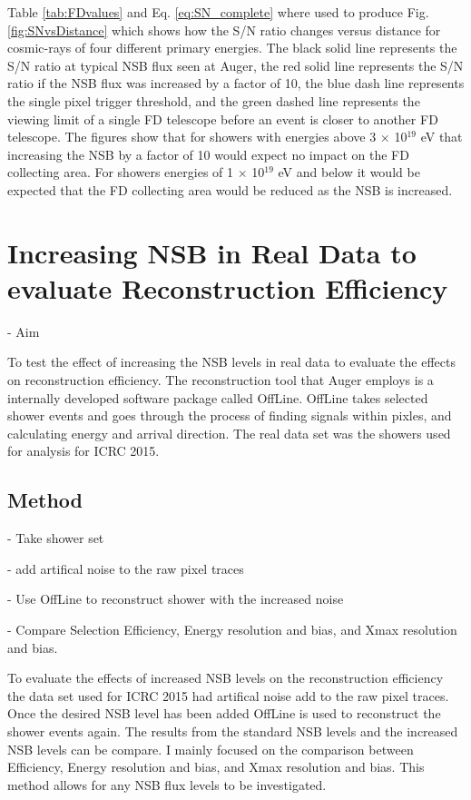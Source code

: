 Table \ref{tab:FDvalues} and Eq. \ref{eq:SN_complete} where used to produce Fig. \ref{fig:SNvsDistance} which shows how the S/N ratio changes versus distance for cosmic-rays of four different primary energies. The black solid line represents the S/N ratio at typical NSB flux seen at Auger, the red solid line represents the S/N ratio if the NSB flux was increased by a factor of 10, the blue dash line represents the single pixel trigger threshold, and the green dashed line represents the viewing limit of a single FD telescope before an event is closer to another FD telescope. The figures show that for showers with energies above 3 $\times$ 10$^{19}$ eV that increasing the NSB by a factor of 10 would expect no impact on the FD collecting area. For showers energies of 1 $\times$ 10$^{19}$ eV and below it would be expected that the FD collecting area would be reduced as the NSB is increased.



\section{Increasing NSB in Real Data to evaluate Reconstruction Efficiency}


- Aim

To test the effect of increasing the NSB levels in real data to evaluate the effects on reconstruction efficiency. The reconstruction tool that Auger employs is a internally developed software package called OffLine. OffLine takes selected shower events and goes through the process of finding signals within pixles, and calculating energy and arrival direction. The real data set was the showers used for analysis for ICRC 2015. 

\subsection{Method}

- Take shower set

- add artifical noise to the raw pixel traces

- Use OffLine to reconstruct shower with the increased noise

- Compare Selection Efficiency, Energy resolution and bias, and Xmax resolution and bias.

To evaluate the effects of increased NSB levels on the reconstruction efficiency the data set used for ICRC 2015 had artifical noise add to the raw pixel traces. Once the desired NSB level has been added OffLine is used to reconstruct the shower events again. The results from the standard NSB levels and the increased NSB levels can be compare. I mainly focused on the comparison between Efficiency, Energy resolution and bias, and Xmax resolution and bias. This method allows for any NSB flux levels to be investigated.



